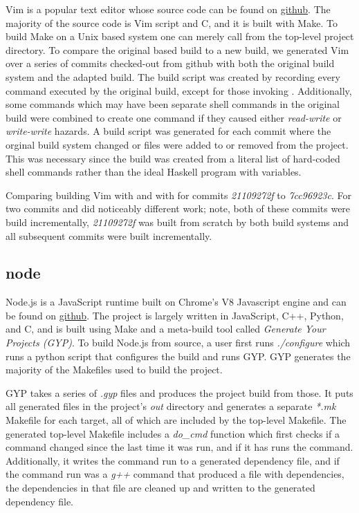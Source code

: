 Vim is a popular text editor whose source code can be found on \href{https://github.com/vim/vim}{github}.  The majority of the source code is Vim script and C, and it is built with Make.  To build Make on a Unix based system one can merely call \Make from the top-level project directory.  To compare the original \Make based build to a new \Rattle build, we generated Vim over a series of commits checked-out from github with both the original build system and the adapted \Rattle build.  The \Rattle build script was created by recording every command executed by the original build, except for those invoking \Make.  Additionally, some commands which may have been separate shell commands in the original build were combined to create one command if they caused either \emph{read-write} or \emph{write-write} hazards.  A \Rattle build script was generated for each commit where the orginal build system changed or files were added to or removed from the project.  This was necessary since the \Rattle build was created from a literal list of hard-coded shell commands rather than the ideal Haskell program with variables.


Comparing building Vim \cite{} with \Make and with \Rattle for commits \emph{21109272f} to \emph{7cc96923c}.  For two commits \Make and \Rattle did noticeably different work; note, both of these commits were build incrementally, \emph{21109272f} was built from scratch by both build systems and all subsequent commits were built incrementally.


\subsection{node}
\label{sec:eval:node}

Node.js is a JavaScript runtime built on Chrome's V8 Javascript engine and can be found on \href{``https://github.com/nodejs/node''}{github}.  The project is largely written in JavaScript, C++, Python, and C, and is built using Make and a meta-build tool called \emph{Generate Your Projects (GYP)}.  To build Node.js from source, a user first runs \emph{./configure} which runs a python script that configures the build and runs GYP.  GYP generates the majority of the Makefiles used to build the project.

GYP takes a series of \emph{.gyp} files and produces the project build from those.  It puts all generated files in the project's \emph{out} directory and generates a separate \emph{*.mk} Makefile for each target, all of which are included by the top-level Makefile.  The generated top-level Makefile includes a \emph{do\_cmd} function which first checks if a command changed since the last time it was run, and if it has runs the command.  Additionally, it writes the command run to a generated dependency file, and if the command run was a \emph{g++} command that produced a file with dependencies, the dependencies in that file are cleaned up and written to the generated dependency file.

